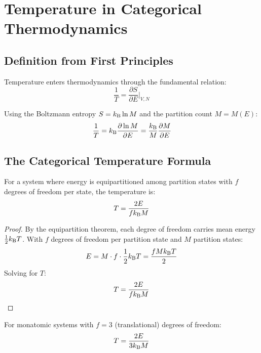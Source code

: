 \section{Temperature in Categorical Thermodynamics}

\subsection{Definition from First Principles}

Temperature enters thermodynamics through the fundamental relation:
\begin{equation}
\frac{1}{T} = \frac{\partial S}{\partial E}\bigg|_{V,N}
\label{eq:temp_fundamental}
\end{equation}

Using the Boltzmann entropy $S = k_{\mathrm{B}} \ln M$ and the partition count $M = M(E)$:
\begin{equation}
\frac{1}{T} = k_{\mathrm{B}} \frac{\partial \ln M}{\partial E} = \frac{k_{\mathrm{B}}}{M} \frac{\partial M}{\partial E}
\label{eq:temp_derivative}
\end{equation}

\subsection{The Categorical Temperature Formula}

\begin{theorem}
\label{thm:categorical_temperature}
For a system where energy is equipartitioned among partition states with $f$ degrees of freedom per state, the temperature is:
\begin{equation}
T = \frac{2E}{f k_{\mathrm{B}} M}
\label{eq:categorical_temperature}
\end{equation}
\end{theorem}

\begin{proof}
By the equipartition theorem, each degree of freedom carries mean energy $\frac{1}{2}k_{\mathrm{B}} T$. With $f$ degrees of freedom per partition state and $M$ partition states:
\begin{equation}
E = M \cdot f \cdot \frac{1}{2} k_{\mathrm{B}} T = \frac{f M k_{\mathrm{B}} T}{2}
\end{equation}
Solving for $T$:
\begin{equation}
T = \frac{2E}{f k_{\mathrm{B}} M}
\end{equation}
\end{proof}

\begin{corollary}
For monatomic systems with $f = 3$ (translational) degrees of freedom:
\begin{equation}
T = \frac{2E}{3k_{\mathrm{B}} M}
\label{eq:monatomic_temperature}
\end{equation}
\end{corollary}

